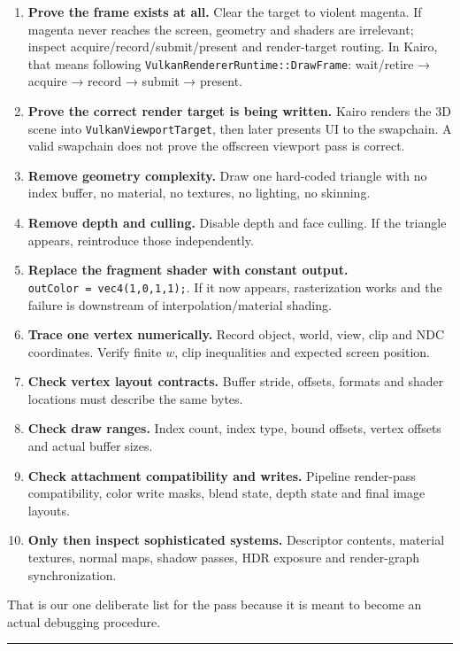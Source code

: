\begin{enumerate}
\def\labelenumi{\arabic{enumi}.}
\item
  \textbf{Prove the frame exists at all.} Clear the target to violent magenta. If magenta never reaches the screen, geometry and shaders are irrelevant; inspect acquire/record/submit/present and render-target routing. In Kairo, that means following \texttt{VulkanRendererRuntime::DrawFrame}: wait/retire → acquire → record → submit → present.
\item
  \textbf{Prove the correct render target is being written.} Kairo renders the 3D scene into \texttt{VulkanViewportTarget}, then later presents UI to the swapchain. A valid swapchain does not prove the offscreen viewport pass is correct.
\item
  \textbf{Remove geometry complexity.} Draw one hard-coded triangle with no index buffer, no material, no textures, no lighting, no skinning.
\item
  \textbf{Remove depth and culling.} Disable depth and face culling. If the triangle appears, reintroduce those independently.
\item
  \textbf{Replace the fragment shader with constant output.} \texttt{outColor\ =\ vec4(1,0,1,1);}. If it now appears, rasterization works and the failure is downstream of interpolation/material shading.
\item
  \textbf{Trace one vertex numerically.} Record object, world, view, clip and NDC coordinates. Verify finite \(w\), clip inequalities and expected screen position.
\item
  \textbf{Check vertex layout contracts.} Buffer stride, offsets, formats and shader locations must describe the same bytes.
\item
  \textbf{Check draw ranges.} Index count, index type, bound offsets, vertex offsets and actual buffer sizes.
\item
  \textbf{Check attachment compatibility and writes.} Pipeline render-pass compatibility, color write masks, blend state, depth state and final image layouts.
\item
  \textbf{Only then inspect sophisticated systems.} Descriptor contents, material textures, normal maps, shadow passes, HDR exposure and render-graph synchronization.
\end{enumerate}

That is our one deliberate list for the pass because it is meant to become an actual debugging procedure.

\begin{center}\rule{0.5\linewidth}{0.5pt}\end{center}

